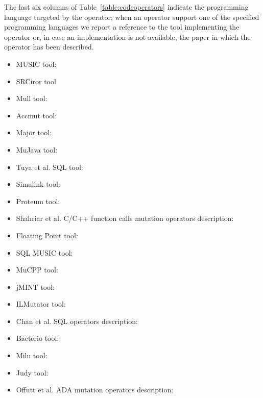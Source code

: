 
The last six columns of Table~\ref{table:codeoperators} indicate the programming language targeted by the operator; when an operator support one of the specified programming languages we report a reference to the tool implementing the operator or, in case an implementation is not available, the paper in which the operator has been described.

\begin{itemize}
	\item MUSIC tool: \cite{phan2018music}
	\item SRCiror tool\cite{hariri2018srciror}
	\item Mull tool: \cite{denisov2018mull}
	\item Accmut tool: \cite{wang2017faster}
	\item Major tool: \cite{just2014major}
	\item MuJava tool: \cite{ma2006mujava}
	\item Tuya et al. SQL tool: \cite{tuya2007mutating}
	\item Simulink tool: \cite{binh2012mutation}
	\item Proteum tool: \cite{delamaro2001interface}
	\item Shahriar et al. C/C++ function calls mutation operators description: \cite{shahriar2008mutation} %
	\item Floating Point tool: \cite{dan2012semantic}
	\item SQL MUSIC tool: \cite{shahriar2008music}
	\item MuCPP tool: \cite{delgado2017assessment}
	\item jMINT tool: \cite{grechanik2016mutation}
	\item ILMutator tool: \cite{derezinska2011object}
	\item Chan et al. SQL operators description: \cite{chan2005fault}
	\item Bacterio tool: \cite{mateo2012validating}
	\item Milu tool: \cite{jia2008milu}
	\item Judy tool: \cite{madeyski2010judy}
	\item Offutt et al. ADA mutation operators description: \cite{rothermel1996experimental} 
\end{itemize}


